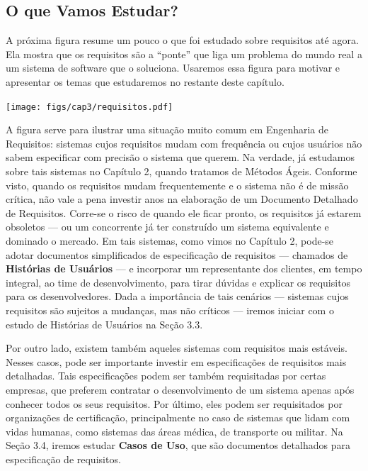 \documentclass[
  11pt,
  twoside]{book}
\let\origfigure\figure
\let\endorigfigure\endfigure
\renewenvironment{figure}[1][2] {
    \expandafter\origfigure\expandafter[!h]
} {
    \endorigfigure
}
\begin{document}
\hypertarget{o-que-vamos-estudar}{%
\subsection{O que Vamos Estudar?}\label{o-que-vamos-estudar}}

A próxima figura resume um pouco o que foi estudado sobre requisitos até
agora. Ela mostra que os requisitos são a ``ponte'' que liga um problema
do mundo real a um sistema de software que o soluciona. Usaremos essa
figura para motivar e apresentar os temas que estudaremos no restante
deste capítulo.

\begin{figure}
\centering
\texttt{[image: figs/cap3/requisitos.pdf]}
\caption{Requisitos são a ``ponte'' que liga um problema do mundo real a
um sistema de software que o soluciona.}
\end{figure}

A figura serve para ilustrar uma situação muito comum em Engenharia de
Requisitos: sistemas cujos requisitos mudam com frequência ou cujos
usuários não sabem especificar com precisão o sistema que querem. Na
verdade, já estudamos sobre tais sistemas no Capítulo 2, quando tratamos
de Métodos Ágeis. Conforme visto, quando os requisitos mudam
frequentemente e o sistema não é de missão crítica, não vale a pena
investir anos na elaboração de um Documento Detalhado de Requisitos.
Corre-se o risco de quando ele ficar pronto, os requisitos já estarem
obsoletos --- ou um concorrente já ter construído um sistema equivalente
e dominado o mercado. Em tais sistemas, como vimos no Capítulo 2,
pode-se adotar documentos simplificados de especificação de requisitos
--- chamados de \textbf{Histórias de Usuários} --- e incorporar um
representante dos clientes, em tempo integral, ao time de
desenvolvimento, para tirar dúvidas e explicar os requisitos para os
desenvolvedores. Dada a importância de tais cenários --- sistemas cujos
requisitos são sujeitos a mudanças, mas não críticos --- iremos iniciar
com o estudo de Histórias de Usuários na Seção 3.3.

Por outro lado, existem também aqueles sistemas com requisitos mais
estáveis. Nesses casos, pode ser importante investir em especificações
de requisitos mais detalhadas. Tais especificações podem ser também
requisitadas por certas empresas, que preferem contratar o
desenvolvimento de um sistema apenas após conhecer todos os seus
requisitos. Por último, eles podem ser requisitados por organizações de
certificação, principalmente no caso de sistemas que lidam com vidas
humanas, como sistemas das áreas médica, de transporte ou militar. Na
Seção 3.4, iremos estudar \textbf{Casos de Uso}, que são documentos
detalhados para especificação de requisitos.
\end{document}
